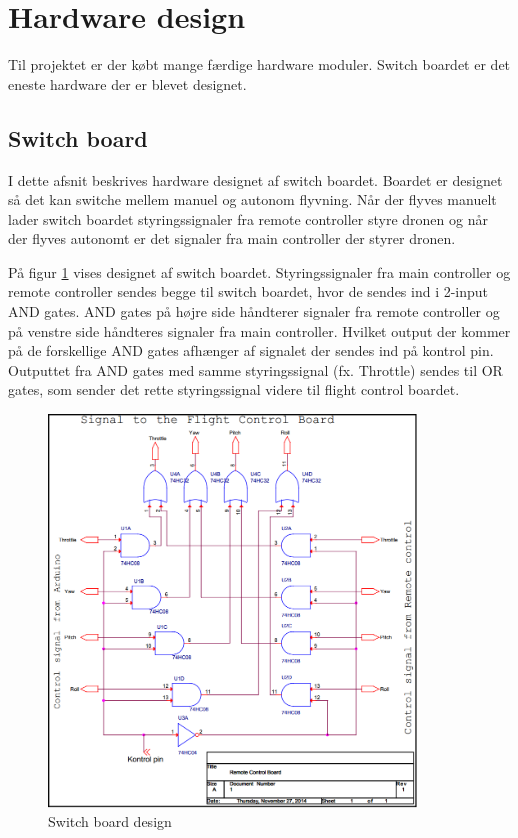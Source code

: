 \section{Hardware design}
\vspace{-0.5cm}
Til projektet er der købt mange færdige hardware moduler. Switch boardet er det eneste hardware der er blevet designet. 

\vspace{-0.3cm}

\subsection{Switch board}
\vspace{-0.4cm}
I dette afsnit beskrives hardware designet af switch boardet. Boardet er designet så det kan switche mellem manuel og autonom flyvning. Når der flyves manuelt lader switch boardet styringssignaler fra remote controller styre dronen og når der flyves autonomt er det signaler fra main controller der styrer dronen.

På figur \ref{fig:switchboard_design} vises designet af switch boardet.
Styringssignaler fra main controller og remote controller sendes begge til switch boardet, hvor de sendes ind i 2-input AND gates. AND gates på højre side håndterer signaler fra remote controller og på venstre side håndteres signaler fra main controller. Hvilket output der kommer på de forskellige AND gates afhænger af signalet der sendes ind på kontrol pin. Outputtet fra AND gates med samme styringssignal (fx. Throttle) sendes til OR gates, som sender det rette styringssignal videre til flight control boardet. 


\begin{figure}[H]
	\centering
	\includegraphics[width=0.87\textwidth]{Billeder/hardware/switch_board_diagram.png}
	\caption{Switch board design}
	\label{fig:switchboard_design}
\end{figure}
